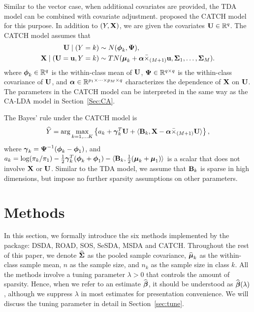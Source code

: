 Similar to the vector case, when additional covariates are provided, the TDA model can be combined with covariate adjustment. \cite{catch} proposed the CATCH model for this purpose. In addition to $(Y,\mathbf{X})$, we are given the covariates $\mathbf{U}\in\mathbb{R}^q$. The CATCH model assumes that
\begin{align}
\mathbf{U}\mid(Y=k) & \sim  N(\boldsymbol{\phi}_{k},\boldsymbol{\Psi}),\\
\mathbf{X}\mid(\mathbf{U}=\mathbf{u},Y=k) & \sim  TN(\boldsymbol{\mu}_{k}+\boldsymbol{\alpha}\bar{\times}_{(M+1)}\mathbf{u},\boldsymbol{\Sigma}_{1},\dots,\boldsymbol{\Sigma}_{M}).
\end{align}
where $\boldsymbol{\phi}_k\in\mathbb{R}^q$ is the within-class mean of $\mathbf{U}$, $\boldsymbol{\Psi}\in\mathbb{R}^{q\times q}$ is the within-class covariance of $\mathbf{U}$, and $\boldsymbol{\alpha}\in\mathbb{R}^{p_1\times\cdots\times p_M\times q}$ characterizes the dependence of $\mathbf{X}$ on $\mathbf{U}$. The parameters in the CATCH model can be interpreted in the same way as the CA-LDA model in Section~\ref{Sec:CA}.



The Bayes' rule under the CATCH model is
\begin{equation}\label{bayescatch}
\widehat{Y}=\arg\max_{k=1,\dots K}\left\{ a_k+\boldsymbol{\gamma}_{k}^T\mathbf{U}+\langle\mathbf{B}_{k},\mathbf{X}-\boldsymbol{\alpha}\bar{\times}_{(M+1)}\mathbf{U}\rangle\right\},
\end{equation}
where $\boldsymbol{\gamma}_k=\boldsymbol{\Psi}^{-1}(\boldsymbol{\phi}_k-\boldsymbol{\phi}_1)$, and $a_k=\log({\pi_k}/{\pi_1})-\frac{1}{2}\boldsymbol{\gamma}_k^T(\boldsymbol{\phi}_k+\boldsymbol{\phi}_1)-\langle \mathbf{B}_k,\frac{1}{2}(\boldsymbol{\mu}_k+\boldsymbol{\mu}_1)\rangle$ is a scalar that does not involve $\mathbf{X}$ or $\mathbf{U}$. Similar to the TDA model, we assume that $\mathbf{B}_k$ is sparse in high dimensions, but impose no further sparsity assumptions on other parameters. 





\section{Methods}\label{sec:para}


In this section, we formally introduce the six methods implemented by the package: DSDA, ROAD, SOS, SeSDA, MSDA and CATCH. 
Throughout the rest of this paper, we denote $\widehat{\boldsymbol{\Sigma}}$ as the pooled sample covariance, $\widehat{\boldsymbol{\mu}}_k$ as the within-class sample mean, $n$ as the sample size, and $n_k$ as the sample size in class $k$. All the methods involve a tuning parameter $\lambda>0$ that controls the amount of sparsity. Hence, when we refer to an estimate $\widehat{\boldsymbol{\beta}}$, it should be understood as $\widehat{\boldsymbol{\beta}}(\lambda)$, although we suppress $\lambda$ in most estimates for presentation convenience. We will discuss the tuning parameter in detail in Section~\ref{sec:tune}. 



